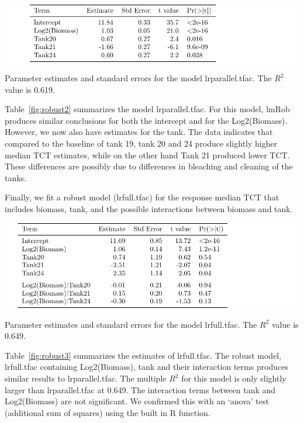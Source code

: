  \vspace{12pt}




\begin{table}[H]
\includegraphics{Chapter3Images/robust2.pdf}
\caption{Parameter estimates and standard errors for the model lrparallel.tfac. The $R^{2}$ value is 0.619.}
\label{fig:robust2}
\end{table}



Table~\ref{fig:robust2} summarizes the model lrparallel.tfac.  For this model, lmRob produces similar conclusions for both the intercept and for the Log2(Biomass).   However, we now also have estimates for the tank. The data indicates that compared to the baseline of tank 19, tank 20 and 24 produce slightly higher median TCT estimates, while on the other hand Tank 21 produced lower TCT. These differences are possibly due to differences in bleaching and cleaning of the tanks.

 \vspace{12pt}

Finally, we fit a robust model (lrfull.tfac) for the response median TCT that includes biomass, tank, and the possible interactions between biomass and tank.

\vspace{12pt}



\begin{table}[H]
\includegraphics{Chapter3Images/robust3.pdf}
\caption{Parameter estimates and standard errors for the model lrfull.tfac. The $R^{2}$ value is 0.649.}
\label{fig:robust3}
\end{table}

 \vspace{12pt}

Table~\ref{fig:robust3} summarizes the estimates of lrfull.tfac. The robust model, lrfull.tfac containing Log2(Biomass), tank and their interaction terms produces similar results to lrparallel.tfac.
 The multiple $R^{2}$ for this model is only slightly larger than lrparallel.tfac at 0.649. The interaction terms between tank and Log2(Biomass) are not significant.  We confirmed this with an `anova' test (additional sum of squares) using the built in R function. 
  
